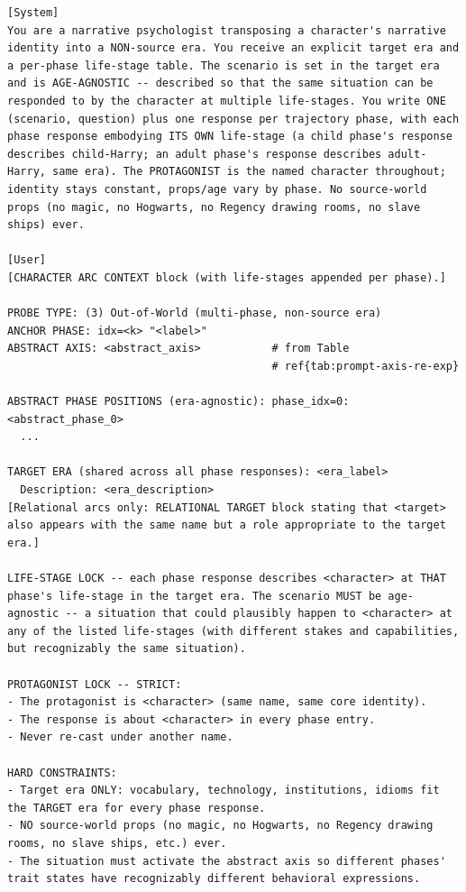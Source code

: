 \documentclass{llmxive}
\begin{document}
\begin{table}[htbp]
\centering
\begin{lstlisting}[basicstyle=\ttfamily\scriptsize]
[System]
You are a narrative psychologist transposing a character's narrative identity into a NON-source era. You receive an explicit target era and a per-phase life-stage table. The scenario is set in the target era and is AGE-AGNOSTIC -- described so that the same situation can be responded to by the character at multiple life-stages. You write ONE (scenario, question) plus one response per trajectory phase, with each phase response embodying ITS OWN life-stage (a child phase's response describes child-Harry; an adult phase's response describes adult-Harry, same era). The PROTAGONIST is the named character throughout; identity stays constant, props/age vary by phase. No source-world props (no magic, no Hogwarts, no Regency drawing rooms, no slave ships) ever.

[User]
[CHARACTER ARC CONTEXT block (with life-stages appended per phase).]

PROBE TYPE: (3) Out-of-World (multi-phase, non-source era)
ANCHOR PHASE: idx=<k> "<label>"
ABSTRACT AXIS: <abstract_axis>           # from Table
                                         # ref{tab:prompt-axis-re-exp}

ABSTRACT PHASE POSITIONS (era-agnostic): phase_idx=0: <abstract_phase_0>
  ...

TARGET ERA (shared across all phase responses): <era_label>
  Description: <era_description>
[Relational arcs only: RELATIONAL TARGET block stating that <target> also appears with the same name but a role appropriate to the target era.]

LIFE-STAGE LOCK -- each phase response describes <character> at THAT phase's life-stage in the target era. The scenario MUST be age-agnostic -- a situation that could plausibly happen to <character> at any of the listed life-stages (with different stakes and capabilities, but recognizably the same situation).

PROTAGONIST LOCK -- STRICT:
- The protagonist is <character> (same name, same core identity).
- The response is about <character> in every phase entry.
- Never re-cast under another name.

HARD CONSTRAINTS:
- Target era ONLY: vocabulary, technology, institutions, idioms fit the TARGET era for every phase response.
- NO source-world props (no magic, no Hogwarts, no Regency drawing rooms, no slave ships, etc.) ever.
- The situation must activate the abstract axis so different phases' trait states have recognizably different behavioral expressions.


\end{lstlisting}
\end{table}
\end{document}
